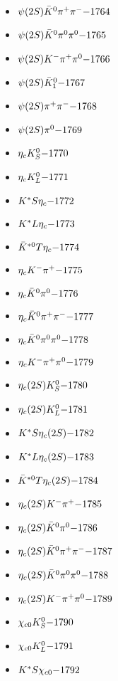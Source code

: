\begin{multicols}{3}
\begin{itemize}
 \item $ \psi(2S) \bar{K}^{0} \pi^{+} \pi^{-} \hfill{-1764}$
 \item $ \psi(2S) \bar{K}^{0} \pi^{0} \pi^{0} \hfill{-1765}$
 \item $ \psi(2S) K^{-} \pi^{+} \pi^{0} \hfill{-1766}$
 \item $ \psi(2S) \bar{K}_{1}^{0} \hfill{-1767}$
 \item $ \psi(2S) \pi^{+} \pi^{-} \hfill{-1768}$
 \item $ \psi(2S) \pi^{0} \hfill{-1769}$
 \item $ \eta_{c} K_{S}^{0} \hfill{-1770}$
 \item $ \eta_{c} K_{L}^{0} \hfill{-1771}$
 \item $ K^{*}S \eta_{c} \hfill{-1772}$
 \item $ K^{*}L \eta_{c} \hfill{-1773}$
 \item $ \bar{K}^{*0}T \eta_{c} \hfill{-1774}$
 \item $ \eta_{c} K^{-} \pi^{+} \hfill{-1775}$
 \item $ \eta_{c} \bar{K}^{0} \pi^{0} \hfill{-1776}$
 \item $ \eta_{c} \bar{K}^{0} \pi^{+} \pi^{-} \hfill{-1777}$
 \item $ \eta_{c} \bar{K}^{0} \pi^{0} \pi^{0} \hfill{-1778}$
 \item $ \eta_{c} K^{-} \pi^{+} \pi^{0} \hfill{-1779}$
 \item $ \eta_{c}(2S) K_{S}^{0} \hfill{-1780}$
 \item $ \eta_{c}(2S) K_{L}^{0} \hfill{-1781}$
 \item $ K^{*}S \eta_{c}(2S) \hfill{-1782}$
 \item $ K^{*}L \eta_{c}(2S) \hfill{-1783}$
 \item $ \bar{K}^{*0}T \eta_{c}(2S) \hfill{-1784}$
 \item $ \eta_{c}(2S) K^{-} \pi^{+} \hfill{-1785}$
 \item $ \eta_{c}(2S) \bar{K}^{0} \pi^{0} \hfill{-1786}$
 \item $ \eta_{c}(2S) \bar{K}^{0} \pi^{+} \pi^{-} \hfill{-1787}$
 \item $ \eta_{c}(2S) \bar{K}^{0} \pi^{0} \pi^{0} \hfill{-1788}$
 \item $ \eta_{c}(2S) K^{-} \pi^{+} \pi^{0} \hfill{-1789}$
 \item $ \chi_{c0} K_{S}^{0} \hfill{-1790}$
 \item $ \chi_{c0} K_{L}^{0} \hfill{-1791}$
 \item $ K^{*}S \chi_{c0} \hfill{-1792}$

\end{itemize}
\end{multicols}
